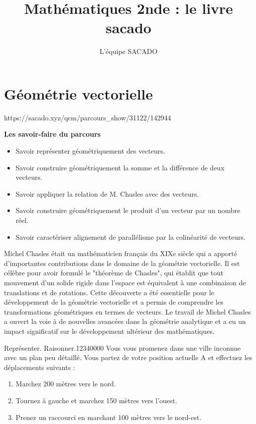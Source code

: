 



\title{Mathématiques 2nde  : le livre sacado}
\author{L'équipe SACADO}




\chapter{Géométrie vectorielle}
{https://sacado.xyz/qcm/parcours_show/31122/142944}
{
 \begin{CpsCol}
	\textbf{Les savoir-faire du parcours}
 	\begin{itemize}
 		\item Savoir représenter géométriquement des vecteurs.
 		\item Savoir construire géométriquement la somme et la différence de deux vecteurs.
 		\item Savoir appliquer la relation de M. Chasles avec des vecteurs.
 		\item Savoir construire géométriquement le produit d'un vecteur par un nombre réel.
 		\item Savoir caractériser alignement de parallélisme par la colinéarité de vecteurs.
 	\end{itemize}
 \end{CpsCol}

\begin{His}
	Michel Chasles était un mathématicien français du XIXe siècle qui a apporté d'importantes contributions dans le domaine de la géométrie vectorielle. Il est célèbre pour avoir formulé le "théorème de Chasles", qui établit que tout mouvement d'un solide rigide dans l'espace est équivalent à une combinaison de translations et de rotations. Cette découverte a été essentielle pour le développement de la géométrie vectorielle et a permis de comprendre les transformations géométriques en termes de vecteurs. Le travail de Michel Chasles a ouvert la voie à de nouvelles avancées dans la géométrie analytique et a eu un impact significatif sur le développement ultérieur des mathématiques.
\end{His}

\begin{ExoDec}{Représenter. Raisonner.}{1234}{0}{0}{0}{0}
Vous vous promenez dans une ville inconnue avec un plan peu détaillé. Vous partez de votre position actuelle A et effectuez les déplacements suivants :
\begin{enumerate}
\item Marchez 200 mètres vers le nord.
\item Tournez à gauche et marchez 150 mètres vers l'ouest.
\item Prenez un raccourci en marchant 100 mètres vers le nord-est.
\end{enumerate}


\end{ExoDec}}
